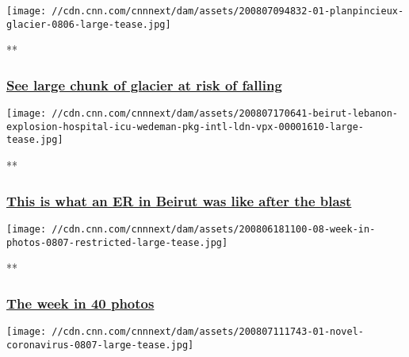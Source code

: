 \texttt{[image: //cdn.cnn.com/cnnnext/dam/assets/200807094832-01-planpincieux-glacier-0806-large-tease.jpg]}

**

\hypertarget{see-large-chunk-of-glacier-at-risk-of-falling}{%
\subsubsection{\texorpdfstring{\href{/videos/world/2020/08/07/evacuation-glacier-collapse-mont-blanc-italy-lon-orig-na.cnn}{See
large chunk of glacier at risk of
falling}}{See large chunk of glacier at risk of falling}}\label{see-large-chunk-of-glacier-at-risk-of-falling}}

\href{/videos/world/2020/08/07/beirut-lebanon-explosion-hospital-icu-wedeman-pkg-intl-ldn-vpx.cnn}{}

\texttt{[image: //cdn.cnn.com/cnnnext/dam/assets/200807170641-beirut-lebanon-explosion-hospital-icu-wedeman-pkg-intl-ldn-vpx-00001610-large-tease.jpg]}

**

\hypertarget{this-is-what-an-er-in-beirut-was-like-after-the-blast}{%
\subsubsection{\texorpdfstring{\href{/videos/world/2020/08/07/beirut-lebanon-explosion-hospital-icu-wedeman-pkg-intl-ldn-vpx.cnn}{This
is what an ER in Beirut was like after the
blast}}{This is what an ER in Beirut was like after the blast}}\label{this-is-what-an-er-in-beirut-was-like-after-the-blast}}

\href{/2020/08/06/world/gallery/photos-this-week-july-30-august-6/index.html}{}

\texttt{[image: //cdn.cnn.com/cnnnext/dam/assets/200806181100-08-week-in-photos-0807-restricted-large-tease.jpg]}

**

\hypertarget{the-week-in-40-photos}{%
\subsubsection{\texorpdfstring{\href{/2020/08/06/world/gallery/photos-this-week-july-30-august-6/index.html}{The
week in 40
photos}}{The week in 40 photos}}\label{the-week-in-40-photos}}

\href{/2020/03/19/world/gallery/novel-coronavirus-outbreak/index.html}{}

\texttt{[image: //cdn.cnn.com/cnnnext/dam/assets/200807111743-01-novel-coronavirus-0807-large-tease.jpg]}

